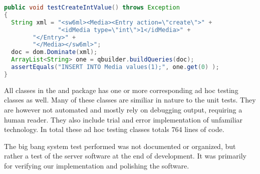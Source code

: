 \begin{Code}
\begin{lstlisting}[label=code:testCase,language=java,caption=A JUnit test case]
public void testCreateIntValue() throws Exception
{
  String xml = "<sw6ml><Media><Entry action=\"create\">" +
               "<idMedia type=\"int\">1</idMedia>" +
		"</Entry>" +
		"</Media></sw6ml>";
  doc = dom.Dominate(xml);
  ArrayList<String> one = qbuilder.buildQueries(doc);
  assertEquals("INSERT INTO Media values(1);", one.get(0) );	
}
\end{lstlisting}
\end{Code}

All classes in the  and  package has one or more corresponding ad hoc testing classes as well. Many of these classes are similiar in nature to the unit tests.
They are however not automated and mostly rely on  debugging output, requiring a human reader. 
They also include trial and error implementation of unfamiliar technology.
In total these ad hoc testing classes totals 764 lines of code.

The big bang system test performed was not documented or organized, but rather a test of the server software at the end of development. It was primarily for verifying our implementation and polishing the software.



